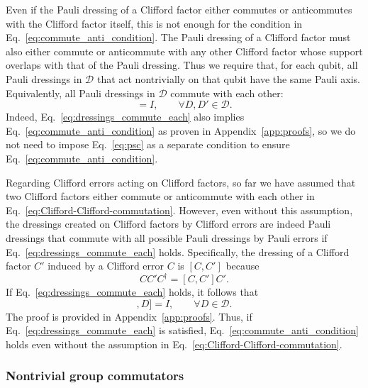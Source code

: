 \documentclass[
 reprint,
 amsmath,amssymb,
 pra,superscriptaddress, nofootinbib
]{revtex4-2}
\theoremstyle{definition}
\theoremstyle{plain}
\begin{document}
Even if the Pauli dressing of a Clifford factor either commutes or anticommutes with the Clifford factor itself, this is not enough for the condition in Eq.~\eqref{eq:commute_anti_condition}. 
The Pauli dressing of a Clifford factor must also either commute or anticommute with any other Clifford factor whose support overlaps with that of the Pauli dressing.
Thus we require that, for each qubit, all Pauli dressings in $\mathcal{D}$ that act nontrivially on that qubit have the same Pauli axis.
Equivalently, all Pauli dressings in $\mathcal{D}$ commute with each other:
\begin{equation}
  [D,D']=I, \qquad \forall D,D'\in\mathcal{D}.
  \label{eq:dressings_commute_each}
\end{equation} 
Indeed, Eq.~\eqref{eq:dressings_commute_each} also implies Eq.~\eqref{eq:commute_anti_condition} as proven in Appendix~\ref{app:proofs}, so we do not need to impose Eq.~\eqref{eq:psc} as a separate condition to ensure Eq.~\eqref{eq:commute_anti_condition}.

Regarding Clifford errors acting on Clifford factors, so far we have assumed that two Clifford factors either commute or anticommute with each other in Eq.~\eqref{eq:Clifford-Clifford-commutation}. However, even without this assumption, the dressings created on Clifford factors by Clifford errors are indeed Pauli dressings that commute with all possible Pauli dressings by Pauli errors if Eq.~\eqref{eq:dressings_commute_each} holds. 
Specifically, the dressing of a Clifford factor $C'$ induced by a Clifford error $C$ is $[C,C']$ because
\begin{equation}
    CC'C^\dagger=[C,C']C'.
\end{equation}
If Eq.~\eqref{eq:dressings_commute_each} holds, it follows that
\begin{equation}
  [[C,C'],D]=I, \qquad \forall D\in\mathcal{D}.
  \label{clifford-clifford-dress}
\end{equation} 
The proof is provided in Appendix~\ref{app:proofs}. Thus, if Eq.~\eqref{eq:dressings_commute_each} is satisfied, Eq.~\eqref{eq:commute_anti_condition} holds even without the assumption in Eq.~\eqref{eq:Clifford-Clifford-commutation}.

\subsubsection{Nontrivial group commutators}
\end{document}
